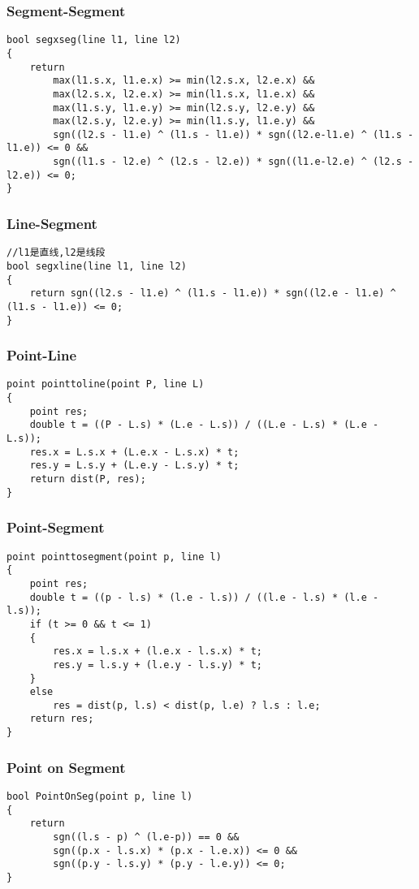 \documentclass[twoside]{article}
\begin{document}
\subsubsection{Segment-Segment}
\begin{lstlisting}
bool segxseg(line l1, line l2)
{
    return
        max(l1.s.x, l1.e.x) >= min(l2.s.x, l2.e.x) &&
        max(l2.s.x, l2.e.x) >= min(l1.s.x, l1.e.x) &&
        max(l1.s.y, l1.e.y) >= min(l2.s.y, l2.e.y) &&
        max(l2.s.y, l2.e.y) >= min(l1.s.y, l1.e.y) &&
        sgn((l2.s - l1.e) ^ (l1.s - l1.e)) * sgn((l2.e-l1.e) ^ (l1.s - l1.e)) <= 0 &&
        sgn((l1.s - l2.e) ^ (l2.s - l2.e)) * sgn((l1.e-l2.e) ^ (l2.s - l2.e)) <= 0;
}
\end{lstlisting}
\subsubsection{Line-Segment}
\begin{lstlisting}
//l1是直线,l2是线段
bool segxline(line l1, line l2)
{
    return sgn((l2.s - l1.e) ^ (l1.s - l1.e)) * sgn((l2.e - l1.e) ^ (l1.s - l1.e)) <= 0;
}
\end{lstlisting}
\subsubsection{Point-Line}
\begin{lstlisting}
point pointtoline(point P, line L)
{
    point res;
    double t = ((P - L.s) * (L.e - L.s)) / ((L.e - L.s) * (L.e - L.s));
    res.x = L.s.x + (L.e.x - L.s.x) * t;
    res.y = L.s.y + (L.e.y - L.s.y) * t;
    return dist(P, res);
}
\end{lstlisting}
\subsubsection{Point-Segment}
\begin{lstlisting}
point pointtosegment(point p, line l)
{
    point res;
    double t = ((p - l.s) * (l.e - l.s)) / ((l.e - l.s) * (l.e - l.s));
    if (t >= 0 && t <= 1)
    {
        res.x = l.s.x + (l.e.x - l.s.x) * t;
        res.y = l.s.y + (l.e.y - l.s.y) * t;
    }
    else
        res = dist(p, l.s) < dist(p, l.e) ? l.s : l.e;
    return res;
}
\end{lstlisting}
\subsubsection{Point on Segment}
\begin{lstlisting}
bool PointOnSeg(point p, line l)
{
    return
        sgn((l.s - p) ^ (l.e-p)) == 0 &&
        sgn((p.x - l.s.x) * (p.x - l.e.x)) <= 0 &&
        sgn((p.y - l.s.y) * (p.y - l.e.y)) <= 0;
}
\end{lstlisting}
\end{document}
